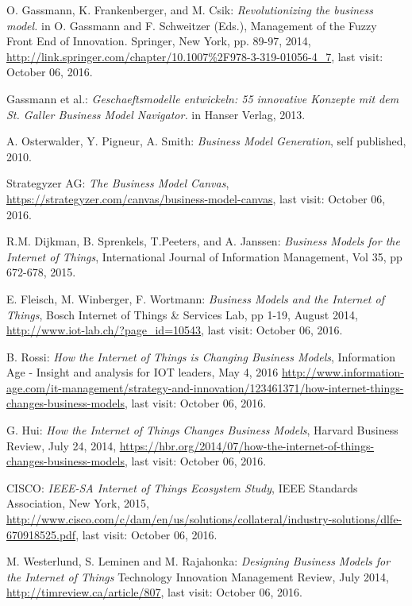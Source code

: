  \begin{thebibliography}{99}
      O. Gassmann, K. Frankenberger, and M. Csik: \emph{Revolutionizing the business model.} in O. Gassmann and F. Schweitzer (Eds.), Management of the Fuzzy Front End of Innovation. Springer, New York, pp. 89-97, 2014, \url{http://link.springer.com/chapter/10.1007%2F978-3-319-01056-4_7}, last visit: October 06, 2016.

	  Gassmann et al.: \emph{Geschaeftsmodelle entwickeln: 55 innovative Konzepte mit dem St. Galler Business Model Navigator.} in Hanser Verlag, 2013.

	  A. Osterwalder, Y. Pigneur, A. Smith: \emph{Business Model Generation}, self published, 2010.

	  Strategyzer AG: \emph{The Business Model Canvas}, \url{https://strategyzer.com/canvas/business-model-canvas}, last visit: October 06, 2016.

	  R.M. Dijkman, B. Sprenkels, T.Peeters, and A. Janssen: \emph{Business Models for the Internet of Things}, International Journal of Information Management, Vol 35, pp 672-678, 2015.

	  E. Fleisch, M. Winberger, F. Wortmann: \emph{Business Models and the Internet of Things}, Bosch Internet of Things \& Services Lab, pp 1-19, August 2014, \url{http://www.iot-lab.ch/?page_id=10543}, last visit: October 06, 2016.

	  B. Rossi: \emph{How the Internet of Things is Changing Business Models}, Information Age - Insight and analysis for IOT leaders, May 4, 2016 \url{http://www.information-age.com/it-management/strategy-and-innovation/123461371/how-internet-things-changes-business-models}, last visit: October 06, 2016.

	  G. Hui: \emph{How the Internet of Things Changes Business Models}, Harvard Business Review, July 24, 2014, \url{https://hbr.org/2014/07/how-the-internet-of-things-changes-business-models}, last visit: October 06, 2016.

	  CISCO: \emph{IEEE-SA Internet of Things Ecosystem Study}, IEEE Standards Association, New York, 2015, \url{http://www.cisco.com/c/dam/en/us/solutions/collateral/industry-solutions/dlfe-670918525.pdf}, last visit: October 06, 2016.

	 M. Westerlund, S. Leminen and M. Rajahonka: \emph{Designing Business Models for the Internet of Things} Technology Innovation Management Review, July 2014, \url{http://timreview.ca/article/807}, last visit: October 06, 2016.


\end{thebibliography}
